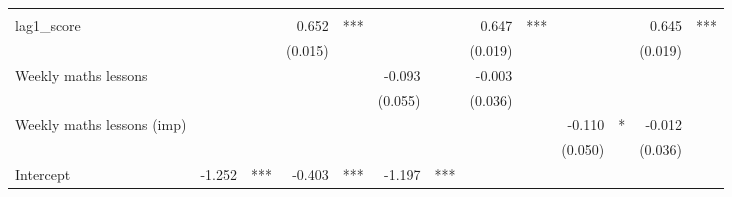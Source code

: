 \documentclass{article}
\begin{document}
\begin{table}[!h]
\begin{tabular}{lllllllllllll}
  \multicolumn{1}{l}{} \\
\multicolumn{1}{l}{lag1\_score} &
  \multicolumn{1}{r}{} &
  \multicolumn{1}{l}{} &
  \multicolumn{1}{r}{0.652} &
  \multicolumn{1}{l}{***} &
  \multicolumn{1}{r}{} &
  \multicolumn{1}{l}{} &
  \multicolumn{1}{r}{0.647} &
  \multicolumn{1}{l}{***} &
  \multicolumn{1}{r}{} &
  \multicolumn{1}{l}{} &
  \multicolumn{1}{r}{0.645} &
  \multicolumn{1}{l}{***} \\
\multicolumn{1}{l}{} &
  \multicolumn{1}{r}{} &
  \multicolumn{1}{l}{} &
  \multicolumn{1}{r}{(0.015)} &
  \multicolumn{1}{l}{} &
  \multicolumn{1}{r}{} &
  \multicolumn{1}{l}{} &
  \multicolumn{1}{r}{(0.019)} &
  \multicolumn{1}{l}{} &
  \multicolumn{1}{r}{} &
  \multicolumn{1}{l}{} &
  \multicolumn{1}{r}{(0.019)} &
  \multicolumn{1}{l}{} \\
\multicolumn{1}{l}{Weekly maths lessons} &
  \multicolumn{1}{r}{} &
  \multicolumn{1}{l}{} &
  \multicolumn{1}{r}{} &
  \multicolumn{1}{l}{} &
  \multicolumn{1}{r}{-0.093} &
  \multicolumn{1}{l}{} &
  \multicolumn{1}{r}{-0.003} &
  \multicolumn{1}{l}{} &
  \multicolumn{1}{r}{} &
  \multicolumn{1}{l}{} &
  \multicolumn{1}{r}{} &
  \multicolumn{1}{l}{} \\
\multicolumn{1}{l}{} &
  \multicolumn{1}{r}{} &
  \multicolumn{1}{l}{} &
  \multicolumn{1}{r}{} &
  \multicolumn{1}{l}{} &
  \multicolumn{1}{r}{(0.055)} &
  \multicolumn{1}{l}{} &
  \multicolumn{1}{r}{(0.036)} &
  \multicolumn{1}{l}{} &
  \multicolumn{1}{r}{} &
  \multicolumn{1}{l}{} &
  \multicolumn{1}{r}{} &
  \multicolumn{1}{l}{} \\
\multicolumn{1}{l}{Weekly maths lessons (imp)} &
  \multicolumn{1}{r}{} &
  \multicolumn{1}{l}{} &
  \multicolumn{1}{r}{} &
  \multicolumn{1}{l}{} &
  \multicolumn{1}{r}{} &
  \multicolumn{1}{l}{} &
  \multicolumn{1}{r}{} &
  \multicolumn{1}{l}{} &
  \multicolumn{1}{r}{-0.110} &
  \multicolumn{1}{l}{*} &
  \multicolumn{1}{r}{-0.012} &
  \multicolumn{1}{l}{} \\
\multicolumn{1}{l}{} &
  \multicolumn{1}{r}{} &
  \multicolumn{1}{l}{} &
  \multicolumn{1}{r}{} &
  \multicolumn{1}{l}{} &
  \multicolumn{1}{r}{} &
  \multicolumn{1}{l}{} &
  \multicolumn{1}{r}{} &
  \multicolumn{1}{l}{} &
  \multicolumn{1}{r}{(0.050)} &
  \multicolumn{1}{l}{} &
  \multicolumn{1}{r}{(0.036)} &
  \multicolumn{1}{l}{} \\
\multicolumn{1}{l}{Intercept} &
  \multicolumn{1}{r}{-1.252} &
  \multicolumn{1}{l}{***} &
  \multicolumn{1}{r}{-0.403} &
  \multicolumn{1}{l}{***} &
  \multicolumn{1}{r}{-1.197} &
  \multicolumn{1}{l}{***} &

\end{tabular}
\end{table}
\end{document}
